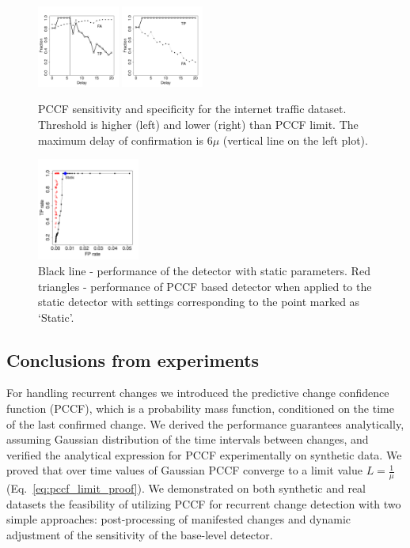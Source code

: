 \begin{figure}[htb!]
\centering
\includegraphics[width=0.24\textwidth]{articles/pics/sdm_paper/performance1sdm.pdf}
\includegraphics[width=0.24\textwidth]{articles/pics/sdm_paper/performance2sdm.pdf}
\caption{
PCCF sensitivity and specificity for the internet traffic dataset.
Threshold is higher (left) and lower (right) than PCCF limit.
The maximum delay of confirmation is $6 \mu $ (vertical line on the left plot).
}
\label{fig:fractraffic}
\end{figure}
%
\begin{figure}[htb!]
\centering
\includegraphics[width=0.3\textwidth]{articles/pics/sdm_paper/ROCimprtraff.pdf}
\caption{
	Black line - performance of the detector with static parameters.
	Red triangles - performance of PCCF based detector when applied to the  static detector with settings corresponding to the point marked as `Static'.
}
\label{fig:rocdynamictraffic}
\end{figure}

\subsection{Conclusions from experiments}
\label{subsec:conclusions}
For handling recurrent changes we introduced the predictive change confidence function (PCCF), which is a probability mass function, conditioned on the time of the last confirmed change.
We derived the performance guarantees analytically, assuming Gaussian distribution of the time intervals between changes, and verified the analytical expression for PCCF experimentally on synthetic data.
We proved that over time values of Gaussian PCCF converge to a limit value $L = \frac{1}{\mu}$ (Eq.~\ref{eq:pccf_limit_proof}).
We demonstrated on both synthetic and real datasets the feasibility of utilizing PCCF for recurrent change detection with two simple approaches: post-processing of manifested changes and dynamic adjustment of the sensitivity of the base-level detector.

